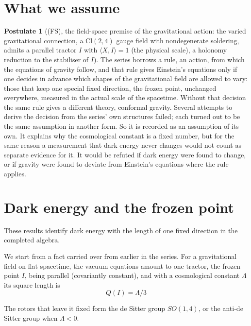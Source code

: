 \documentclass[11pt]{article}
\theoremstyle{definition}
\newtheorem{postulate}[theorem]{Postulate}
\theoremstyle{plain}
\providecommand{\Cl}{}\renewcommand{\Cl}{\mathrm{Cl}}
\providecommand{\ip}{}\renewcommand{\ip}[2]{\langle #1, #2\rangle}
\begin{document}
\section{What we assume}

\begin{postulate}[(FS), the field-space premise of the gravitational action: the varied gravitational connection, a $\Cl(2,4)$ gauge field with nondegenerate soldering, admits a parallel tractor $I$ with $\ip{X}{I} = 1$ (the physical scale), a holonomy reduction to the stabiliser of $I$]\label{c:synthesis.field-space-premise-parallel-frozen-point}
The series borrows a rule, an action, from which the equations of gravity follow, and that rule gives Einstein's equations only if one decides in advance which shapes of the gravitational field are allowed to vary: those that keep one special fixed direction, the frozen point, unchanged everywhere, measured in the actual scale of the spacetime. Without that decision the same rule gives a different theory, conformal gravity. Several attempts to derive the decision from the series' own structures failed; each turned out to be the same assumption in another form. So it is recorded as an assumption of its own. It explains why the cosmological constant is a fixed number, but for the same reason a measurement that dark energy never changes would not count as separate evidence for it. It would be refuted if dark energy were found to change, or if gravity were found to deviate from Einstein's equations where the rule applies.
\end{postulate}

\section{Dark energy and the frozen point}

These results identify dark energy with the length of one fixed direction in the completed algebra.

We start from a fact carried over from earlier in the series. For a gravitational field on flat spacetime, the vacuum equations amount to one tractor, the frozen point $I$, being parallel (covariantly constant), and with a cosmological constant $\Lambda$ its square length is \[ Q(I) = \Lambda/3 \]

The rotors that leave it fixed form the de Sitter group $SO(1,4)$, or the anti-de Sitter group when $\Lambda < 0$.
\end{document}
